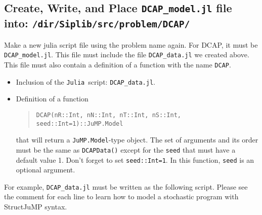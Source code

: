 \documentclass[11pt]{article}
\newcommand{\dcap}{\textsf{DCAP}}
\newcommand{\julia}{\texttt{Julia}}
\newcommand{\jumpmodel}{\texttt{JuMP.Model}}
\begin{document}
\subsection{Create, Write, and Place \texttt{DCAP\_model.jl} file into: \texttt{/dir/Siplib/src/problem/DCAP/}}
Make a new julia script file using the problem name again. For \dcap, it must be \texttt{DCAP\_model.jl}. This file must include the file \texttt{DCAP\_data.jl} we created above. This file must also contain a definition of a function with the name \texttt{DCAP}.
\begin{itemize}
	\item Inclusion of the \julia\ script: \texttt{DCAP\_data.jl}.
	\item Definition of a function
	\begin{quote}\centering\noindent\texttt{DCAP(nR::Int, nN::Int, nT::Int, nS::Int, seed::Int=1)::JuMP.Model
	}\end{quote}
	that will return a \jumpmodel-type object. The set of arguments and its order must be the same as \texttt{DCAPData()} except for the \texttt{seed} that must have a default value 1. Don't forget to set \texttt{seed::Int=1}. In this function, \texttt{seed} is an optional argument.
\end{itemize}
For example, \texttt{DCAP\_data.jl} must be written as the following script. Please see the comment for each line to learn how to model a stochastic program with StructJuMP syntax.
\end{document}
